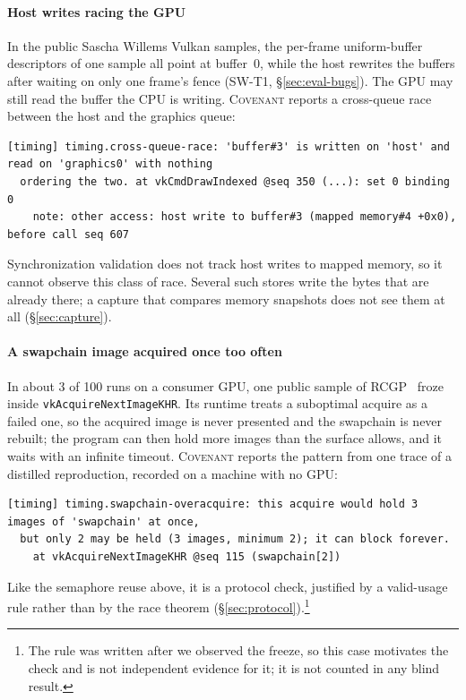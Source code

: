 \documentclass[acmtog,anonymous,review]{acmart}
\newcommand{\sys}{\textsc{Covenant}\xspace}
\newcommand{\rcgp}{RCGP\xspace}
\newcommand{\code}[1]{\texttt{#1}}
\begin{document}
\paragraph{Host writes racing the GPU}
In the public Sascha Willems Vulkan samples, the per-frame uniform-buffer descriptors of one sample all point at
buffer~0, while the host rewrites the buffers after waiting on only one frame's fence (SW-T1, \S\ref{sec:eval-bugs}).
The GPU may still read the buffer the CPU is writing. \sys reports a cross-queue race between the host and the
graphics queue:
\begin{lstlisting}[style=diag]
[timing] timing.cross-queue-race: 'buffer#3' is written on 'host' and read on 'graphics0' with nothing
  ordering the two. at vkCmdDrawIndexed @seq 350 (...): set 0 binding 0
    note: other access: host write to buffer#3 (mapped memory#4 +0x0), before call seq 607
\end{lstlisting}
Synchronization validation does not track host writes to mapped memory, so it cannot observe this class of race.
Several such stores write the bytes that are already there; a capture that compares memory snapshots does not see
them at all (\S\ref{sec:capture}).

\paragraph{A swapchain image acquired once too often}
In about 3 of 100 runs on a consumer GPU, one public sample of \rcgp~\cite{sivaram2026rcgp} froze inside
\code{vkAcquireNextImageKHR}. Its runtime treats a suboptimal acquire as a failed one, so the acquired image is
never presented and the swapchain is never rebuilt; the program can then hold more images than the surface allows,
and it waits with an infinite timeout. \sys reports the pattern from one trace of a distilled reproduction, recorded
on a machine with no GPU:
\begin{lstlisting}[style=diag]
[timing] timing.swapchain-overacquire: this acquire would hold 3 images of 'swapchain' at once,
  but only 2 may be held (3 images, minimum 2); it can block forever.
    at vkAcquireNextImageKHR @seq 115 (swapchain[2])
\end{lstlisting}
Like the semaphore reuse above, it is a protocol check, justified by a valid-usage rule rather than by the race
theorem (\S\ref{sec:protocol}).\footnote{The rule was written after we observed the freeze, so this case motivates the
check and is not independent evidence for it; it is not counted in any blind result.}
\end{document}
